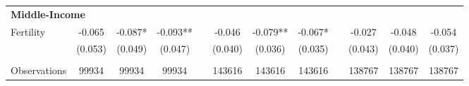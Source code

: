 \begin{table}[htpb!]
\begin{center}
{\begin{tabular}{lcccp{2mm}cccp{2mm}ccc}
\multicolumn{12}{l}{\textbf{Middle-Income}}\\ 
Fertility&-0.065&-0.087*&-0.093**&&-0.046&-0.079**&-0.067*&&-0.027&-0.048&-0.054\\
&(0.053)&(0.049)&(0.047)&&(0.040)&(0.036)&(0.035)&&(0.043)&(0.040)&(0.037)\\
\begin{footnotesize}\end{footnotesize}&\begin{footnotesize}\end{footnotesize}&\begin{footnotesize}\end{footnotesize}&\begin{footnotesize}\end{footnotesize}&\begin{footnotesize}\end{footnotesize}&\begin{footnotesize}\end{footnotesize}&\begin{footnotesize}\end{footnotesize}&\begin{footnotesize}\end{footnotesize}&\begin{footnotesize}\end{footnotesize}&\begin{footnotesize}\end{footnotesize}\\Observations&99934&99934&99934&&143616&143616&143616&&138767&138767&138767\\
\bottomrule
\end{tabular}}\end{center}\end{table}
